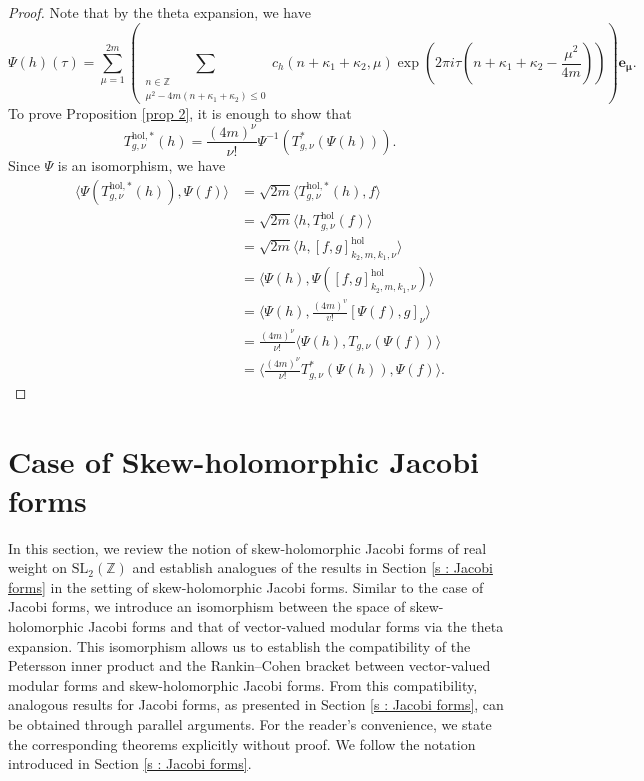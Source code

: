 \documentclass[11pt]{amsart}
\theoremstyle{definition}
\theoremstyle{remark}
\numberwithin{equation}{section}
\renewcommand{\(}{\left(}
\renewcommand{\)}{\right)}
\def\ZZ{\mathbb{Z}}
\begin{document}
\begin{proof}
    Note that by the theta expansion, we have 
    \begin{equation*}
        \Psi(h)(\tau)=\sum_{\mu=1}^{2m} \left(\sum_{\substack{n\in \ZZ\\ \mu^2-4m(n+\kappa_1+\kappa_2)\leq 0}} c_h(n+\kappa_1+\kappa_2,\mu) \exp\left(2\pi i\tau \left(n+\kappa_1+\kappa_2-\frac{\mu^2}{4m} \right)\right)\right) \mathbf{e_{\mu}}.
    \end{equation*}
    To prove Proposition \ref{prop 2}, it is enough to show that
    \[ T^{\mathrm{hol},*}_{g,\nu}(h)=\frac{(4m)^{\nu}}{\nu!}\Psi^{-1}(T^{*}_{g,\nu}(\Psi(h))).\]
    Since $\Psi$ is an isomorphism, we have 
    \begin{equation*}
        \begin{aligned}
            \langle \Psi(T^{\mathrm{hol},*}_{g,\nu}(h)), \Psi(f) \rangle &= \sqrt{2m}\langle  T^{\mathrm{hol},*}_{g,\nu}(h),f \rangle \\
            &=\sqrt{2m} \langle h, T^{\mathrm{hol}}_{g,\nu}(f) \rangle\\
            &= \sqrt{2m} \langle h, [f,g]^{\mathrm{hol}}_{k_2,m,k_1,\nu} \rangle\\
            &=\langle \Psi(h), \Psi([f,g]^{\mathrm{hol}}_{k_2,m,k_1,\nu}) \rangle\\
            &=\langle \Psi(h), \frac{(4m)^v}{v!} [\Psi(f),g]_{\nu} \rangle \\
            &= \frac{(4m)^{\nu}}{\nu !}\langle \Psi(h), T_{g,\nu}(\Psi(f)) \rangle \\
            &=\langle \frac{(4m)^{\nu}}{\nu!}T^{*}_{g,\nu}(\Psi(h)), \Psi(f)  \rangle.
        \end{aligned}
    \end{equation*}
\end{proof}


\section{Case of Skew-holomorphic Jacobi forms}\label{s : skew Jacobi}

In this section, we review the notion of skew-holomorphic Jacobi forms of real weight on $\mathrm{SL}_{2}(\mathbb{Z})$
and establish analogues of the results in Section \ref{s : Jacobi forms} in the setting of skew-holomorphic Jacobi forms.
Similar to the case of Jacobi forms, we introduce an isomorphism between the space of skew-holomorphic Jacobi forms and that of vector-valued modular forms via the theta expansion. 
This isomorphism allows us to establish the compatibility of the Petersson inner product and the Rankin–Cohen bracket between vector-valued modular forms and skew-holomorphic Jacobi forms.
From this compatibility, analogous results for Jacobi forms, as presented in Section \ref{s : Jacobi forms}, can be obtained through parallel arguments. For the reader’s convenience, we state the corresponding theorems explicitly without proof.
We follow the notation introduced in Section \ref{s : Jacobi forms}. 
\end{document}
